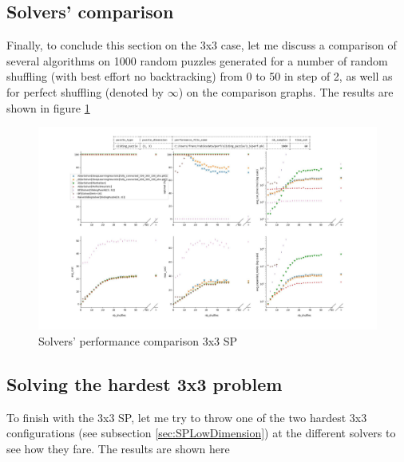 \subsection{Solvers' comparison}
\label{ssec:33SPSC}
Finally, to conclude this section on the 3x3 case, let me discuss a comparison of several algorithms on 1000 random puzzles generated for a number of random shuffling (with best effort no backtracking) from 0 to 50 in step of 2, as well as for perfect shuffling (denoted by $\infty$) on the comparison graphs. The results are shown in figure \ref{fig:33SPPerformance}

\begin{landscape}
\centering\vspace*{\fill}
\begin{figure}[H]
\centering
\includegraphics[scale=0.63]{./Figures/33SPPerformance.jpeg}
\caption[33SPPerformance]{Solvers' performance comparison 3x3 SP}
\label{fig:33SPPerformance}
\end{figure}
\vfill
\end{landscape}
\restoregeometry


\subsection{Solving the hardest 3x3 problem}
To finish with the 3x3 SP, let me try to throw one of the two hardest 3x3 configurations (see subsection \ref{sec:SPLowDimension}) at the different solvers to see how they fare. The results are shown here

